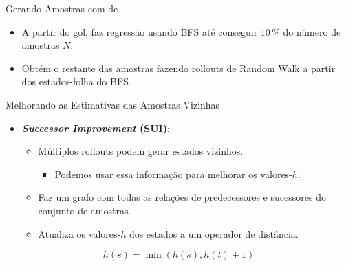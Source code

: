\documentclass{beamer}
\begin{document}
\begin{frame}{Gerando Amostras com \bfsrw de \cite{Bettker.etal/2022}}
\begin{itemize}
  \item A partir do gol, faz \alert{regressão} usando \alert{BFS} até conseguir $10\,\%$ do número de amostras $N$.
  \pause
  \item Obtém o restante das amostras fazendo rollouts de \alert{Random Walk} a partir dos \alert{estados-folha} do BFS.
\end{itemize}
\end{frame}

\begin{frame}{Melhorando as Estimativas das Amostras Vizinhas}
\begin{itemize}
  \item \textbf{\emph{Successor Improvement} (SUI)}:
  \begin{itemize}
    \item Múltiplos rollouts podem gerar \alert{estados vizinhos}.
    \begin{itemize}
      \item Podemos usar essa informação para melhorar os valores-$h$.
    \end{itemize}
    \pause
    \item Faz um \alert{grafo} com todas as relações de predecessores e sucessores do conjunto de amostras.
    \pause
    \item Atualiza os valores-$h$ dos estados a \alert{um operador de distância}.
  \end{itemize}
\end{itemize}
 $$h(s) = \min(h(s), h(t)+1)$$
\end{frame}
\end{document}
